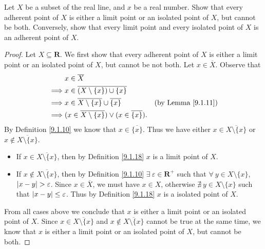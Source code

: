 \begin{exercise}\label{ex 9.1.9}
    Let \(X\) be a subset of the real line, and \(x\) be a real number.
    Show that every adherent point of \(X\) is either a limit point or an isolated point of \(X\), but cannot be both.
    Conversely, show that every limit point and every isolated point of \(X\) is an adherent point of \(X\).
\end{exercise}

\begin{proof}
    Let \(X \subseteq \mathbf{R}\).
    We first show that every adherent point of \(X\) is either a limit point or an isolated point of \(X\), but cannot be not both.
    Let \(x \in \overline{X}\).
    Observe that
    \begin{align*}
                 & x \in \overline{X}                                                                                   \\
        \implies & x \in \overline{(X \setminus \{x\}) \cup \{x\}}                                                      \\
        \implies & x \in \overline{X \setminus \{x\}} \cup \overline{\{x\}}            & \text{(by Lemma \ref{9.1.11})} \\
        \implies & (x \in \overline{X \setminus \{x\}}) \lor (x \in \overline{\{x\}}).
    \end{align*}
    By Definition \ref{9.1.10} we know that \(x \in \overline{\{x\}}\).
    Thus we have either \(x \in \overline{X \setminus \{x\}}\) or \(x \notin \overline{X \setminus \{x\}}\).
    \begin{itemize}
        \item If \(x \in \overline{X \setminus \{x\}}\), then by Definition \ref{9.1.18} \(x\) is a limit point of \(X\).
        \item If \(x \notin \overline{X \setminus \{x\}}\), then by Definition \ref{9.1.10} \(\exists\ \varepsilon \in \mathbf{R}^+\) such that \(\forall\ y \in X \setminus \{x\}\), \(\abs*{x - y} > \varepsilon\).
              Since \(x \in \overline{X}\), we must have \(x \in X\), otherwise \(\nexists\ y \in X \setminus \{x\}\) such that \(\abs*{x - y} \leq \varepsilon\).
              Thus by Definition \ref{9.1.18} \(x\) is a isolated point of \(X\).
    \end{itemize}
    From all cases above we conclude that \(x\) is either a limit point or an isolated point of \(X\).
    Since \(x \in \overline{X \setminus \{x\}}\) and \(x \notin \overline{X \setminus \{x\}}\) cannot be true at the same time, we know that \(x\) is either a limit point or an isolated point of \(X\), but cannot be both.


\end{proof}

